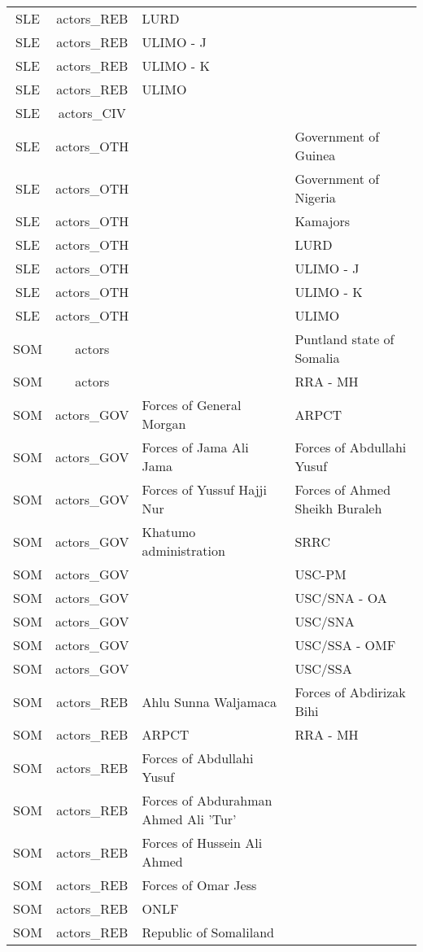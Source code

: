 \documentclass[12pt]{article}
\begin{document}
\begin{center}
\begin{longtable}{|c|c|p{7cm}|p{7cm}|}
  SLE & actors\_REB & LURD &  \\ 
  SLE & actors\_REB & ULIMO - J &  \\ 
  SLE & actors\_REB & ULIMO - K &  \\ 
  SLE & actors\_REB & ULIMO &  \\ 
  SLE & actors\_CIV &  &  \\ 
  SLE & actors\_OTH &  & Government of Guinea \\ 
  SLE & actors\_OTH &  & Government of Nigeria \\ 
  SLE & actors\_OTH &  & Kamajors \\ 
  SLE & actors\_OTH &  & LURD \\ 
  SLE & actors\_OTH &  & ULIMO - J \\ 
  SLE & actors\_OTH &  & ULIMO - K \\ 
  SLE & actors\_OTH &  & ULIMO \\ 
  SOM & actors &  & Puntland state of Somalia \\ 
  SOM & actors &  & RRA - MH \\ 
  SOM & actors\_GOV & Forces of General Morgan & ARPCT \\ 
  SOM & actors\_GOV & Forces of Jama Ali Jama & Forces of Abdullahi Yusuf \\ 
  SOM & actors\_GOV & Forces of Yussuf Hajji Nur & Forces of Ahmed Sheikh Buraleh \\ 
  SOM & actors\_GOV & Khatumo administration & SRRC \\ 
  SOM & actors\_GOV &  & USC-PM \\ 
  SOM & actors\_GOV &  & USC/SNA - OA \\ 
  SOM & actors\_GOV &  & USC/SNA \\ 
  SOM & actors\_GOV &  & USC/SSA - OMF \\ 
  SOM & actors\_GOV &  & USC/SSA \\ 
  SOM & actors\_REB & Ahlu Sunna Waljamaca & Forces of Abdirizak Bihi \\ 
  SOM & actors\_REB & ARPCT & RRA - MH \\ 
  SOM & actors\_REB & Forces of Abdullahi Yusuf &  \\ 
  SOM & actors\_REB & Forces of Abdurahman Ahmed Ali 'Tur' &  \\ 
  SOM & actors\_REB & Forces of Hussein Ali Ahmed &  \\ 
  SOM & actors\_REB & Forces of Omar Jess &  \\ 
  SOM & actors\_REB & ONLF &  \\ 
  SOM & actors\_REB & Republic of Somaliland &  \\ 

\end{longtable}
\end{center}
\end{document}
